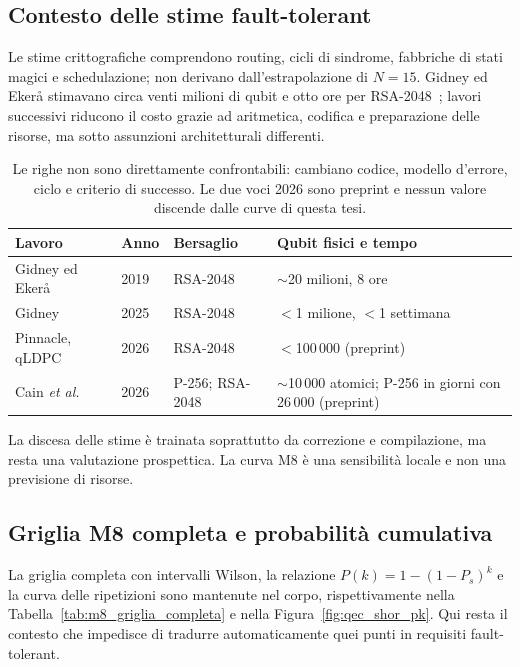\begin{onehalfspace}
\subsection{Contesto delle stime fault-tolerant}
\label{app:shor_risorse}

Le stime crittografiche comprendono routing, cicli di sindrome, fabbriche
di stati magici e schedulazione; non derivano dall'estrapolazione di
$N=15$. Gidney ed Eker\aa{} stimavano circa venti milioni di qubit e otto
ore per RSA-2048~\cite{gidney2021}; lavori successivi riducono il costo
grazie ad aritmetica, codifica e preparazione delle risorse, ma sotto
assunzioni architetturali differenti.

\begin{table}[H]
\centering
\small
\begin{tabular}{p{}p{}p{}p{}}
\toprule
\textbf{Lavoro} & \textbf{Anno} & \textbf{Bersaglio} & \textbf{Qubit fisici e tempo} \\
\midrule
Gidney ed Eker\aa{}~\cite{gidney2021} & 2019 & RSA-2048 & $\sim$20 milioni, 8 ore \\
Gidney~\cite{gidney2025} & 2025 & RSA-2048 & $<$1 milione, $<$1 settimana \\
Pinnacle, qLDPC~\cite{pinnacle2026} & 2026 & RSA-2048 & $<$100\,000 (preprint) \\
Cain \emph{et al.}~\cite{cain2026} & 2026 & P-256; RSA-2048 & $\sim$10\,000 atomici; P-256 in giorni con 26\,000 (preprint) \\
\bottomrule
\end{tabular}
\caption[Traiettoria delle stime di risorsa per Shor su scala crittografica]{Le
righe non sono direttamente confrontabili: cambiano codice, modello
d'errore, ciclo e criterio di successo. Le due voci 2026 sono preprint e
nessun valore discende dalle curve di questa tesi.}
\label{tab:traiettoria_risorse}
\end{table}

La discesa delle stime è trainata soprattutto da correzione e
compilazione, ma resta una valutazione prospettica. La curva M8 è una
sensibilità locale e non una previsione di risorse.

\subsection{Griglia M8 completa e probabilità cumulativa}
\label{app:shor_m8_dettaglio}

La griglia completa con intervalli Wilson, la relazione
$P(k)=1-(1-P_s)^k$ e la curva delle ripetizioni sono mantenute nel corpo,
rispettivamente nella Tabella~\ref{tab:m8_griglia_completa} e nella
Figura~\ref{fig:qec_shor_pk}. Qui resta il contesto che impedisce di tradurre
automaticamente quei punti in requisiti fault-tolerant.


\end{onehalfspace}
